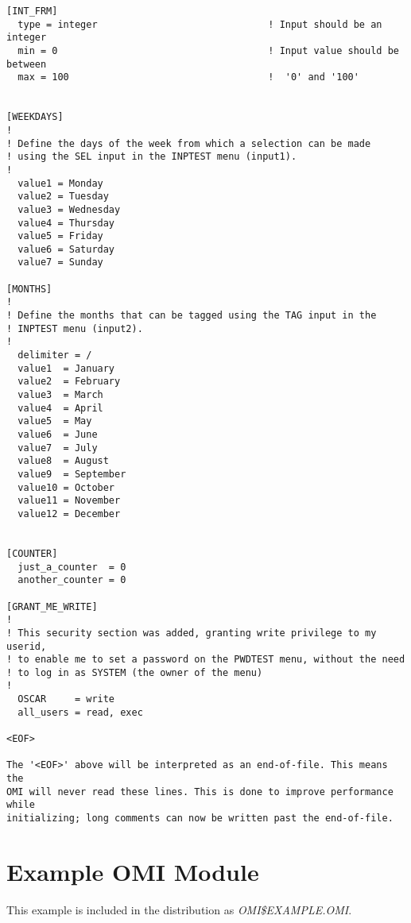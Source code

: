 \documentclass[a4paper]{book}
\begin{document}
\begin{verbatim}
[INT_FRM]
  type = integer                              ! Input should be an integer
  min = 0                                     ! Input value should be between
  max = 100                                   !  '0' and '100'


[WEEKDAYS]
!
! Define the days of the week from which a selection can be made
! using the SEL input in the INPTEST menu (input1).
!
  value1 = Monday
  value2 = Tuesday
  value3 = Wednesday
  value4 = Thursday
  value5 = Friday
  value6 = Saturday
  value7 = Sunday

[MONTHS]
!
! Define the months that can be tagged using the TAG input in the 
! INPTEST menu (input2).
!
  delimiter = /
  value1  = January
  value2  = February
  value3  = March
  value4  = April
  value5  = May
  value6  = June
  value7  = July
  value8  = August
  value9  = September
  value10 = October
  value11 = November
  value12 = December


[COUNTER]
  just_a_counter  = 0
  another_counter = 0

[GRANT_ME_WRITE]
!
! This security section was added, granting write privilege to my userid,
! to enable me to set a password on the PWDTEST menu, without the need
! to log in as SYSTEM (the owner of the menu)
!
  OSCAR     = write
  all_users = read, exec

<EOF>

The '<EOF>' above will be interpreted as an end-of-file. This means the
OMI will never read these lines. This is done to improve performance while
initializing; long comments can now be written past the end-of-file.
\end{verbatim}

\chapter{Example OMI Module}

This example is included in the distribution as \textsl{OMI{\$}EXAMPLE.OMI}.
\end{document}
